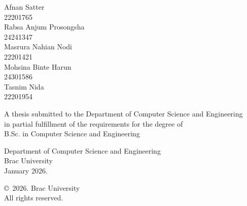 \begin{titlepage}
\renewcommand*{\thepage}{Title} %

    \begin{center} 
        \vspace*{3cm} %
        
        {\fontsize{17pt}{22pt}\selectfont{The Optimality of Uniform Privacy Budget Allocation in Byzantine-Resilient Federated Learning for Anti-UAV Detection}} %
        
        \vspace{1.5cm}
        
        
        \vspace{0.5cm}
        
        	Afnan Satter\\
	        22201765\\
            Rabsa Anjum Prosongsha\\
	        24241347\\
	        Masrura Nahian Nodi\\
	        22201421\\
	        Mohsina Binte Harun\\
	        24301586\\
            Tasnim Nida\\
            22201954\\

        \vspace{1.5cm}
        
        	A thesis submitted to the Department of Computer Science and Engineering\\
            in partial fulfillment of the requirements for the degree of\\
            B.Sc. in Computer Science and Engineering

        
        \vspace{2.5cm}
        
    		Department of Computer Science and Engineering\\
            Brac University\\
            January 2026.
        
        \vspace{3cm}
        
    		\copyright\ 2026. Brac University\\
            All rights reserved.
    
    \end{center}

\end{titlepage}